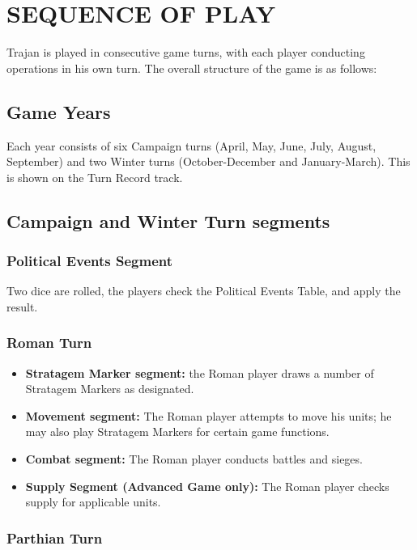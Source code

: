 \section{SEQUENCE OF PLAY}

Trajan is played in consecutive game turns, with each player conducting operations in his own turn. The overall structure of the game is as follows:

\subsection{Game Years}

Each year consists of six Campaign turns (April, May, June, July, August, September) and two Winter turns (October-December and January-March). This is shown on the Turn Record track.

\subsection{Campaign and Winter Turn segments}

\subsubsection{Political Events Segment}

Two dice are rolled, the players check the Political Events Table, and apply the result.

\subsubsection{Roman Turn}

\begin{itemize}
  \item \textbf{Stratagem Marker segment:} the Roman player draws a number of Stratagem Markers as designated.
  \item \textbf{Movement segment:} The Roman player attempts to move his units; he may also play Stratagem Markers for certain game functions.
  \item \textbf{Combat segment:} The Roman player conducts battles and sieges.
  \item \textbf{Supply Segment (Advanced Game only):} The Roman player checks supply for applicable units.
\end{itemize}

\subsubsection{Parthian Turn}

